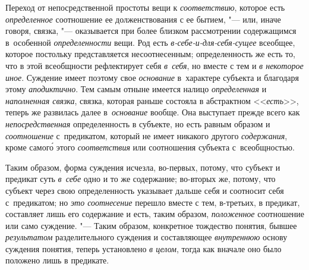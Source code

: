 Переход от непосредственной простоты вещи к {\em соответствию}, которое есть
{\em определенное} соотношение ее долженствования с ее бытием, "--- или, иначе
говоря, связка, "--- оказывается при более близком рассмотрении содержащимся
в~особенной {\em определенности} вещи. Род есть {\em в-себе-и-для-себя-сущее}
всеобщее, которое постольку представляется несоотнесенным; определенность же
есть то, что в этой всеобщности рефлектирует себя {\em в~себя}, но вместе с тем
и {\em в некоторое иное}. Суждение имеет поэтому свое {\em основание}
в~характере субъекта и благодаря этому {\em аподиктично}. Тем самым отныне
имеется налицо {\em определенная} и {\em наполненная связка}, связка, которая
раньше состояла в абстрактном <<{\em есть}>>, теперь же развилась далее
в~{\em основание} вообще. Она выступает прежде всего как {\em непосредственная}
определенность в субъекте, но есть равным образом и {\em соотношение}
с~предикатом, который не имеет никакого другого {\em содержания}, кроме
самог\'{о} этого {\em соответствия} или соотношения субъекта с~всеобщностью.

Таким образом, форма суждения исчезла, во-первых, потому, что
субъект и предикат суть {\em в~себе}
одно и то же содержание; во-вторых же, потому, что субъект
через свою определенность указывает дальше себя и соотносит себя
с~предикатом; но {\em это соотнесение} перешло вместе с тем, в-третьих,
в предикат, составляет лишь его содержание и есть, таким образом,
{\em положенное} соотношение или само суждение. "--- Таким образом,
конкретное тождество понятия, бывшее {\em результатом} разделительного суждения
и составляющее {\em внутреннюю} основу суждения понятия, теперь установлено
{\em в целом}, тогда как вначале оно было положено лишь в предикате.

